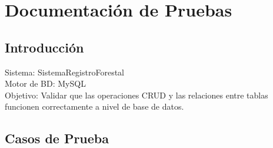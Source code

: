 \chapter{Documentación de Pruebas}
\label{cap:pruebas}

\section{Introducción}
Sistema: SistemaRegistroForestal \\
Motor de BD: MySQL \\
Objetivo: Validar que las operaciones CRUD y las relaciones entre tablas funcionen correctamente a nivel de base de datos.

\section{Casos de Prueba}

